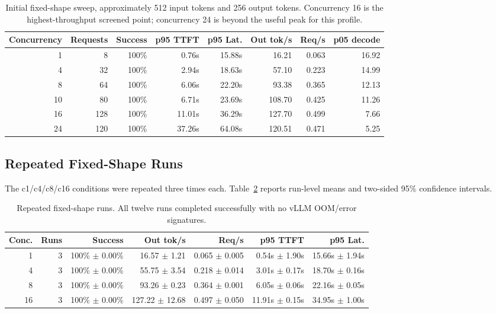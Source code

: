 \documentclass[11pt]{article}
\begin{document}
\begin{table}[h]
\centering
\small
\begin{tabular}{rrrrrrrr}
\toprule
Concurrency & Requests & Success & p95 TTFT & p95 Lat. & Out tok/s & Req/s & p05 decode \\
\midrule
1  & 8   & 100\% & 0.76s  & 15.88s & 16.21  & 0.063 & 16.92 \\
4  & 32  & 100\% & 2.94s  & 18.63s & 57.10  & 0.223 & 14.99 \\
8  & 64  & 100\% & 6.06s  & 22.20s & 93.38  & 0.365 & 12.13 \\
10 & 80  & 100\% & 6.71s  & 23.69s & 108.70 & 0.425 & 11.26 \\
16 & 128 & 100\% & 11.01s & 36.29s & 127.70 & 0.499 & 7.66 \\
24 & 120 & 100\% & 37.26s & 64.08s & 120.51 & 0.471 & 5.25 \\
\bottomrule
\end{tabular}
\caption{Initial fixed-shape sweep, approximately 512 input tokens and 256 output
tokens. Concurrency 16 is the highest-throughput screened point; concurrency 24
is beyond the useful peak for this profile.}
\label{tab:fixed_shape_sweep}
\end{table}

\subsection{Repeated Fixed-Shape Runs}

The c1/c4/c8/c16 conditions were repeated three times each. Table~\ref{tab:ci}
reports run-level means and two-sided 95\% confidence intervals.

\begin{table}[h]
\centering
\small
\begin{tabular}{rrrrrrr}
\toprule
Conc. & Runs & Success & Out tok/s & Req/s & p95 TTFT & p95 Lat. \\
\midrule
1  & 3 & 100\% $\pm$ 0.00\% & 16.57 $\pm$ 1.21  & 0.065 $\pm$ 0.005 & 0.54s $\pm$ 1.90s  & 15.66s $\pm$ 1.94s \\
4  & 3 & 100\% $\pm$ 0.00\% & 55.75 $\pm$ 3.54  & 0.218 $\pm$ 0.014 & 3.01s $\pm$ 0.17s  & 18.70s $\pm$ 0.16s \\
8  & 3 & 100\% $\pm$ 0.00\% & 93.26 $\pm$ 0.23  & 0.364 $\pm$ 0.001 & 6.05s $\pm$ 0.06s  & 22.16s $\pm$ 0.05s \\
16 & 3 & 100\% $\pm$ 0.00\% & 127.22 $\pm$ 12.68 & 0.497 $\pm$ 0.050 & 11.91s $\pm$ 0.15s & 34.95s $\pm$ 1.00s \\
\bottomrule
\end{tabular}
\caption{Repeated fixed-shape runs. All twelve runs completed successfully with
no vLLM OOM/error signatures.}
\label{tab:ci}
\end{table}
\end{document}
